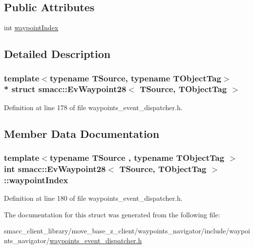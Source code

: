 \subsection*{Public Attributes}
\begin{DoxyCompactItemize}
\item 
int \hyperlink{structsmacc_1_1EvWaypoint28_a55c163435ded40b57ca1edca5d8ddfa8}{waypoint\+Index}
\end{DoxyCompactItemize}


\subsection{Detailed Description}
\subsubsection*{template$<$typename T\+Source, typename T\+Object\+Tag$>$\\*
struct smacc\+::\+Ev\+Waypoint28$<$ T\+Source, T\+Object\+Tag $>$}



Definition at line 178 of file waypoints\+\_\+event\+\_\+dispatcher.\+h.



\subsection{Member Data Documentation}
\subsubsection[{\texorpdfstring{waypoint\+Index}{waypointIndex}}]{\setlength{\rightskip}{0pt plus 5cm}template$<$typename T\+Source , typename T\+Object\+Tag $>$ int {\bf smacc\+::\+Ev\+Waypoint28}$<$ T\+Source, T\+Object\+Tag $>$\+::waypoint\+Index}\hypertarget{structsmacc_1_1EvWaypoint28_a55c163435ded40b57ca1edca5d8ddfa8}{}\label{structsmacc_1_1EvWaypoint28_a55c163435ded40b57ca1edca5d8ddfa8}


Definition at line 180 of file waypoints\+\_\+event\+\_\+dispatcher.\+h.



The documentation for this struct was generated from the following file\+:\begin{DoxyCompactItemize}
\item 
smacc\+\_\+client\+\_\+library/move\+\_\+base\+\_\+z\+\_\+client/waypoints\+\_\+navigator/include/waypoints\+\_\+navigator/\hyperlink{waypoints__event__dispatcher_8h}{waypoints\+\_\+event\+\_\+dispatcher.\+h}\end{DoxyCompactItemize}
